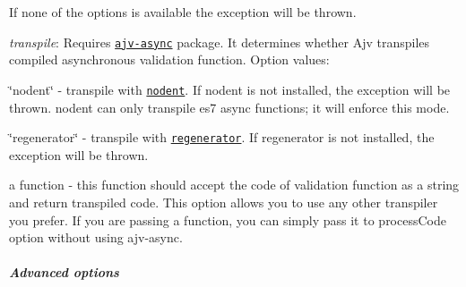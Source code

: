 \begin{DoxyItemize}
If none of the options is available the exception will be thrown.
\item {\itshape transpile}\+: Requires \href{https://github.com/epoberezkin/ajv-async}{\tt ajv-\/async} package. It determines whether Ajv transpiles compiled asynchronous validation function. Option values\+:
\begin{DoxyItemize}
\item {\ttfamily \char`\"{}nodent\char`\"{}} -\/ transpile with \href{https://github.com/MatAtBread/nodent}{\tt nodent}. If nodent is not installed, the exception will be thrown. nodent can only transpile es7 async functions; it will enforce this mode.
\item {\ttfamily \char`\"{}regenerator\char`\"{}} -\/ transpile with \href{https://github.com/facebook/regenerator}{\tt regenerator}. If regenerator is not installed, the exception will be thrown.
\item a function -\/ this function should accept the code of validation function as a string and return transpiled code. This option allows you to use any other transpiler you prefer. If you are passing a function, you can simply pass it to {\ttfamily process\+Code} option without using ajv-\/async.
\end{DoxyItemize}
\end{DoxyItemize}

\subparagraph*{Advanced options}



